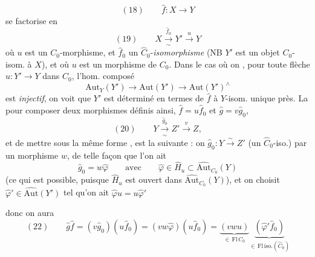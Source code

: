 \documentclass[11pt,a4paper]{article}
\begin{document}
\[
  (18)\qquad \hat{f}\colon X\longrightarrow Y
\]
se factorise en
\[
  (19)\qquad X\xrightarrow[\ \sim\ ]{\ \hat{f}_{0}\ }Y'\xrightarrow{\ u\ }Y
\]
où $u$ est un $C_{0}$-morphisme, et $\hat{f}_{0}$ un $\widehat{C}_{0}$-\emph{isomorphisme} (NB $Y'$ est un objet $C_{0}$-isom. à $X$), et où $u$ est un morphisme de $C_{0}$. Dans le cas où on , pour toute flèche $u\colon Y'\to Y$ dans $C_{0}$, l'hom. composé
\[
  \mathrm{Aut}_{Y}(Y')\longrightarrow\mathrm{Aut}(Y')\longrightarrow\mathrm{Aut}(Y')^{\wedge}
\]
est \emph{injectif}, on voit que $Y'$ est déterminé en termes de $\hat{f}$ à $Y$-isom. unique près. \struck{\ill{}} La   pour composer deux morphismes définis ainsi, $\hat{f}=u\hat{f}_{0}$ et $\hat{g}=v\hat{g}_{0}$,
\[
  (20)\qquad Y\xrightarrow[\ \sim\ ]{\ \hat{g}_{0}\ }Z'\xrightarrow{\ v\ }Z,
\]
et de mettre sous la même forme \ill{}, est la suivante : on  $\hat{g}_{0}\colon Y\xrightarrow{\sim}Z'$ (un $\widehat{C}_{0}$-iso.) par un  morphisme $w$, de telle façon que l'on ait
\[
  \hat{g}_{0}=w\hat{\varphi}\qquad\text{avec}\qquad \hat{\varphi}\in\hat{H}_{u}\subset\widehat{\mathrm{Aut}}_{C_{0}}(Y)
\]
(ce qui est possible, puisque $\hat{H}_{u}$ est ouvert dans $\widehat{\mathrm{Aut}}_{C_{0}}(Y)$), et on choisit $\hat{\varphi}'\in\widehat{\mathrm{Aut}}(Y')$ tel qu'on ait $\hat{\varphi}u=u\hat{\varphi}'$



donc on aura
\[
  (22)\qquad \hat{g}\hat{f}=(v\hat{g}_{0})(u\hat{f}_{0})=(vw\hat{\varphi})(u\hat{f}_{0})=\underbrace{(vwu)}_{\in\,\mathrm{Fl}\,C_{0}}\underbrace{(\hat{\varphi}'\hat{f}_{0})}_{\in\,\mathrm{Fl\,iso.}(\widehat{C}_{0})}
\]
\end{document}
